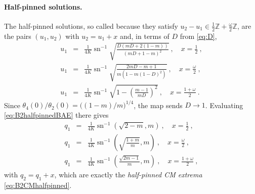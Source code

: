 \documentclass[aps, prx, nofootinbib, twocolumn,amsfonts,amsmath,amssymb,mathtools,superscriptaddress,preprintnumbers,floatfix,reprint]{revtex4-2}
\DeclareMathOperator{\sn}{sn}
\begin{document}
\paragraph{Half-pinned solutions.}
The half-pinned solutions, so called because they satisfy
$u_2-u_1\in\tfrac12\mathbb{Z}+\tfrac{\omega}{2}\mathbb{Z}$, are the pairs
$(u_1,u_2)$ with $u_2=u_1+x$ and, in terms of $D$ from \eqref{eq:D},
\begin{subequations}\label{eq:B2halfpinnedBAE}
\begin{eqnarray}
  u_1&=&\tfrac{1}{4K}\sn^{-1}\sqrt{\tfrac{D(mD+2(1-m))}{(mD+1-m)^2}}\ , \quad  x=\tfrac12\ ,\\
  u_1&=&\tfrac{1}{4K}\sn^{-1}\sqrt{\tfrac{2mD-m+1}{m\left(1-m(1-D)^2\right)}}\ , \quad  x=\tfrac{\omega}{2}\ ,\\
  u_1&=&\tfrac{1}{4K}\sn^{-1}\sqrt{1-\left(\tfrac{m-1}{mD}\right)^{2}}\ , \quad x=\tfrac{1+\omega}{2}\ .
\end{eqnarray}
\end{subequations}
Since $\theta_4(0)/\theta_2(0)=\big((1-m)/m\big)^{1/4}$, the map sends $D\to1$.
Evaluating \eqref{eq:B2halfpinnedBAE} there gives
\begin{subequations}\label{eq:B2halfpinnedimage}
\begin{eqnarray}
  q_1&=&\tfrac{1}{4K}\sn^{-1}\left(\sqrt{2-m},m\right)\ , \quad x=\tfrac12\ ,\\
  q_1&=&\tfrac{1}{4K}\sn^{-1}\left(\sqrt{\tfrac{1+m}{m}},m\right)\ , \quad x=\tfrac{\omega}{2}\ ,\\
  q_1&=&\tfrac{1}{4K}\sn^{-1}\left(\tfrac{\sqrt{2m-1}}{m},m\right)\ ,\quad x=\tfrac{1+\omega}{2}\ ,
\end{eqnarray}
\end{subequations}
with $q_2=q_1+x$, which are exactly the \emph{half-pinned CM extrema}
\eqref{eq:B2CMhalfpinned}.
\end{document}
